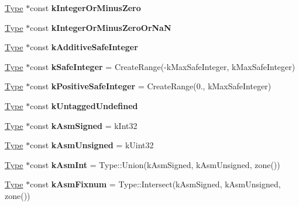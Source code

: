 \begin{DoxyCompactItemize}
\item 
\hyperlink{classv8_1_1internal_1_1_type}{Type} $\ast$const {\bfseries k\+Integer\+Or\+Minus\+Zero}
\item 
\hyperlink{classv8_1_1internal_1_1_type}{Type} $\ast$const {\bfseries k\+Integer\+Or\+Minus\+Zero\+Or\+NaN}
\item 
\hyperlink{classv8_1_1internal_1_1_type}{Type} $\ast$const {\bfseries k\+Additive\+Safe\+Integer}
\item 
\hyperlink{classv8_1_1internal_1_1_type}{Type} $\ast$const {\bfseries k\+Safe\+Integer} = Create\+Range(-\/k\+Max\+Safe\+Integer, k\+Max\+Safe\+Integer)\hypertarget{classv8_1_1internal_1_1_type_cache_a3b4ad30b42e3972dc60e97c43e9cd2cb}{}\label{classv8_1_1internal_1_1_type_cache_a3b4ad30b42e3972dc60e97c43e9cd2cb}

\item 
\hyperlink{classv8_1_1internal_1_1_type}{Type} $\ast$const {\bfseries k\+Positive\+Safe\+Integer} = Create\+Range(0., k\+Max\+Safe\+Integer)\hypertarget{classv8_1_1internal_1_1_type_cache_a23ea0796af8d7fa6bc48239b8417102b}{}\label{classv8_1_1internal_1_1_type_cache_a23ea0796af8d7fa6bc48239b8417102b}

\item 
\hyperlink{classv8_1_1internal_1_1_type}{Type} $\ast$const {\bfseries k\+Untagged\+Undefined}
\item 
\hyperlink{classv8_1_1internal_1_1_type}{Type} $\ast$const {\bfseries k\+Asm\+Signed} = k\+Int32\hypertarget{classv8_1_1internal_1_1_type_cache_a0eb4ae93cd21fe44d91b9a3304bbe2d9}{}\label{classv8_1_1internal_1_1_type_cache_a0eb4ae93cd21fe44d91b9a3304bbe2d9}

\item 
\hyperlink{classv8_1_1internal_1_1_type}{Type} $\ast$const {\bfseries k\+Asm\+Unsigned} = k\+Uint32\hypertarget{classv8_1_1internal_1_1_type_cache_a8774e6fcf01b1dbd8bd7568ae5935ec0}{}\label{classv8_1_1internal_1_1_type_cache_a8774e6fcf01b1dbd8bd7568ae5935ec0}

\item 
\hyperlink{classv8_1_1internal_1_1_type}{Type} $\ast$const {\bfseries k\+Asm\+Int} = Type\+::\+Union(k\+Asm\+Signed, k\+Asm\+Unsigned, zone())\hypertarget{classv8_1_1internal_1_1_type_cache_a61e7b33d53afaf595372cb9b84673021}{}\label{classv8_1_1internal_1_1_type_cache_a61e7b33d53afaf595372cb9b84673021}

\item 
\hyperlink{classv8_1_1internal_1_1_type}{Type} $\ast$const {\bfseries k\+Asm\+Fixnum} = Type\+::\+Intersect(k\+Asm\+Signed, k\+Asm\+Unsigned, zone())\hypertarget{classv8_1_1internal_1_1_type_cache_ad0a46e94ff888915202c8a815d70975b}{}\label{classv8_1_1internal_1_1_type_cache_ad0a46e94ff888915202c8a815d70975b}


\end{DoxyCompactItemize}
